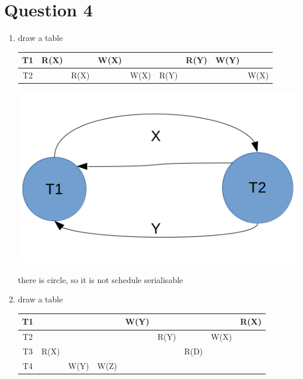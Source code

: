 \documentclass[11pt, a4paper]{article}
\begin{document}
\section*{Question 4}
\renewcommand{\labelenumi}{\roman{enumi}. }
\begin{enumerate}
    \item draw a table\\
    \begin{tabular}{ | c | c | c |c | c | c |c | c | c |}
        \hline
        T1 & R(X) &      & W(X) &      &      & R(Y) & W(Y) &     \\
        \hline
        T2 &      & R(X) &      & W(X) & R(Y) &      &      & W(X)\\
        \hline
    \end{tabular}
    \begin{center}
        \includegraphics[scale=0.7]{41}
    \end{center}
    there is circle, so it is not schedule serialisable
    \item draw a table\\
    \begin{tabular}{ | c | c | c |c | c | c |c | c | c |}
        \hline
        T1 &      &      &      & W(Y) &      &      &      & R(X)\\
        \hline
        T2 &      &      &      &      & R(Y) &      & W(X) &     \\
        \hline
        T3 & R(X) &      &      &      &      & R(D) &      &     \\
        \hline
        T4 &      & W(Y) & W(Z) &      &      &      &      &     \\
        \hline
    \end{tabular}
    \begin{center}

\end{center}
\end{enumerate}
\end{document}
